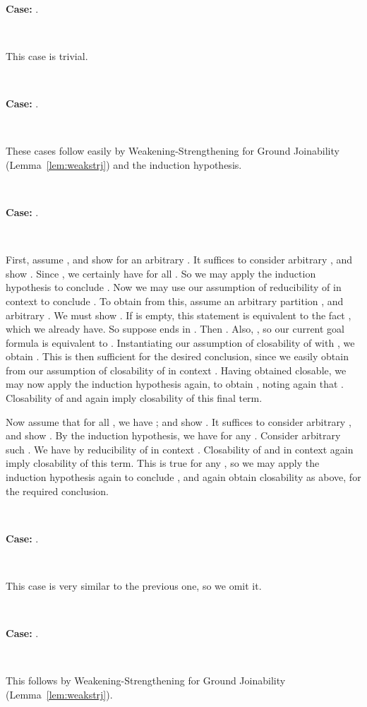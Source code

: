 \documentclass[copyright]{eptcs}
\begin{document}
\

\noindent \textbf{Case:} .

\

\noindent This case is trivial.

\ 

\noindent \textbf{Case:} .

\

\noindent These cases follow easily by Weakening-Strengthening for Ground
Joinability (Lemma~\ref{lem:weakstrj}) and the induction hypothesis.

\ 

\noindent \textbf{Case:} .

\

\noindent First, assume , and
show  for an arbitrary
.  It suffices to consider arbitrary
, and show
.  Since
, we certainly have
 for all
.  So we may apply the induction
hypothesis to conclude .
Now we may use our assumption of reducibility of  in context
 to conclude
.  To obtain
 from this,
assume an arbitrary partition
, and arbitrary
.  We must show .  If  is
empty, this statement is equivalent to the fact
, which we already
have.  So suppose  ends in .  Then
.  Also, , so
our current goal formula is equivalent to .  Instantiating
our assumption of closability of  with
, we obtain .  This is then sufficient for the
desired conclusion, since we easily obtain  from our assumption of
closability of  in context .  Having obtained 
closable, we may now apply the induction hypothesis again, to obtain
, noting again
that .  Closability of  and  again
imply closability of this final term.

Now assume that for all , we have
; and show
.  It suffices to consider
arbitrary , and show
.  By the induction
hypothesis, we have  for any
.  Consider arbitrary such .  We have
 by
reducibility of  in context .  Closability of  and
 in context  again imply closability of this
term. This is true for any , so we may apply the induction
hypothesis again to conclude
, and again obtain
closability as above, for the required conclusion.

\

\noindent \textbf{Case:} .

\

\noindent This case is very similar to the previous one, so we omit it.

\ 

\noindent \textbf{Case:} .

\

\noindent This follows by Weakening-Strengthening for Ground
Joinability (Lemma~\ref{lem:weakstrj}).
\end{document}
